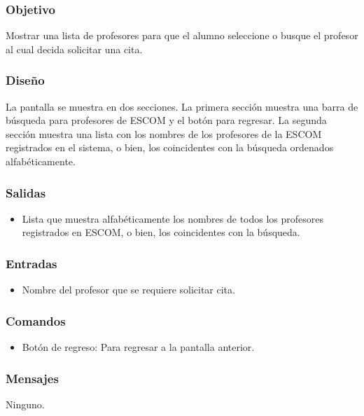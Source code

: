 \subsubsection{Objetivo}
	\noindent
	Mostrar una lista de profesores para que el alumno seleccione o busque el profesor al cual decida solicitar una cita.

\subsubsection{Diseño}
	\noindent
	La pantalla se muestra en dos secciones. La primera sección muestra una barra de búsqueda para profesores de ESCOM y el botón para regresar. La segunda sección muestra una lista con los nombres de los profesores de la ESCOM registrados en el sistema, o bien, los coincidentes con la búsqueda ordenados alfabéticamente. 


\subsubsection{Salidas}
	\begin{itemize}
		\item Lista que muestra alfabéticamente los nombres de todos los profesores registrados en ESCOM, o bien, los coincidentes con la búsqueda. 
	\end{itemize}

\subsubsection{Entradas}

\begin{itemize}
		\item Nombre del profesor que se requiere solicitar cita.  
	\end{itemize}

\subsubsection{Comandos}
\begin{itemize}
		\item Botón de regreso: Para regresar a la pantalla anterior. 
	\end{itemize}

\subsubsection{Mensajes}
Ninguno.


